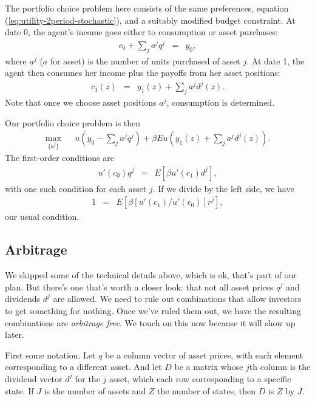 \documentclass[11pt]{article}
\begin{document}
The portfolio choice problem here consists of the same preferences,
equation (\ref{eq:utility-2period-stochastic}),
and a suitably modified budget constraint.
At date 0, the agent's income goes either to consumption
or asset purchases:
\begin{eqnarray*}
    c_0 + \sum_j a^j q^j &=& y_0 ,
\end{eqnarray*}
where $a^j$ ($a$ for asset) is the number of units
purchased of asset $j$.
At date 1, the agent then consumes her income
plus the payoffs from her asset positions:
\begin{eqnarray*}
    c_1(z)  &=& y_1(z) + \sum_j a^j d^j(z) .
\end{eqnarray*}
Note that once we choose asset positions $a^j$,
consumption is determined.

Our portfolio choice problem is then
\begin{eqnarray}
    \max_{\{ a^j \}} && u \left(y_0 - \sum_j a^j q^j \right)
            + \beta E u \left( y_1(z) + \sum_j a^j d^j(z) \right) .
\end{eqnarray}
The first-order conditions are
\begin{eqnarray}
 u' \left(c_0\right) q^j &=& E \left[ \beta u'\left( c_1 \right) d^j \right] ,
\end{eqnarray}
with one such condition for each asset $j$.
If we divide by the left side,
we have
\begin{eqnarray}
 1  &=& E \left[ \beta [u'\left( c_1 \right)/u' \left(c_0\right)] r^j \right] ,
\end{eqnarray}
our usual condition.


\subsection*{Arbitrage}

We skipped some of the technical details above,
which is ok, that's part of our plan.
But there's one that's worth a closer look:
that not all asset prices $q^j$
and dividends $d^j$ are allowed.
We need to rule out combinations that allow
investors to get something for nothing.
Once we've ruled them out, we have the resulting
combinations are {\it arbitrage free\/}.
We touch on this now because it will show up later.

First some notation.
Let $q$ be a column vector of asset prices,
with each element corresponding to a different asset.
And let $D$ be a matrix whose $j$th column is the dividend
vector $d^j$ for the $j$ asset, which each row corresponding
to a specific state.
If $J$ is the number of assets and $Z$ the number of states,
then $D$ is $Z$ by $J$.
\end{document}
